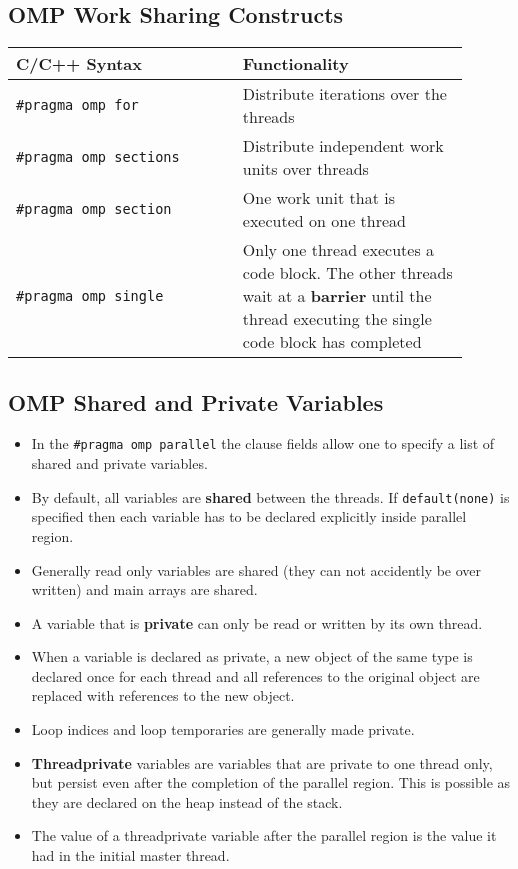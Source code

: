 \documentclass{article}
\begin{document}
\subsection{OMP Work Sharing Constructs}
\begin{tabular}{|p{0.45\linewidth}|p{0.45\linewidth}|}
    \hline
    \textbf{C/C++ Syntax} & \textbf{Functionality} \\
    \hline
    \texttt{\#pragma omp for} & Distribute iterations over the threads\\
    \hline
    \texttt{\#pragma omp sections} & Distribute independent work units over threads\\
    \hline
    \texttt{\#pragma omp section} & One work unit that is executed on one thread \\
    \hline
    \texttt{\#pragma omp single} & Only one thread executes a code block. The other threads wait at a \textbf{barrier} until the thread executing the single code block has completed\\
    \hline
\end{tabular}

\subsection{OMP Shared and Private Variables}
\begin{itemize}
    \item In the \texttt{\#pragma omp parallel} the clause fields allow one to specify a list of shared and private variables. 
    
    \item By default, all variables are \textbf{shared} between the threads. If \texttt{default(none)} is specified then each variable has to be declared explicitly inside parallel region.
    
    \item Generally read only variables are shared (they can not accidently be over written) and main arrays are shared.
    
    \item A variable that is \textbf{private} can only be read or written by its own thread.

    \item When a variable is declared as private, a new object of the same type is declared once for each thread and all references to the original object are replaced with references to the new object.
    
    \item Loop indices and loop temporaries are  generally made private.
    
    \item \textbf{Threadprivate} variables are variables that are private to one thread only, but persist even after the completion of the parallel region. This is possible as they are declared on the heap instead of the stack. 
    
    \item The value of a threadprivate variable after the parallel region is the value it had in the initial master thread. 
\end{itemize}
\end{document}
